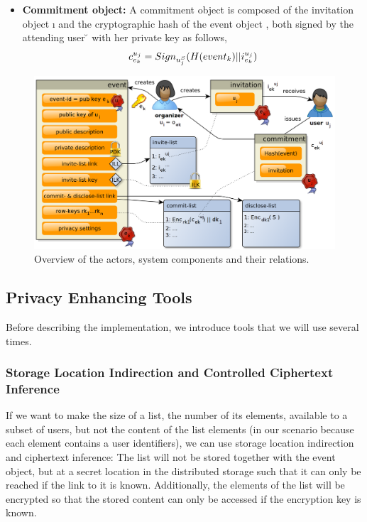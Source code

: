 \begin{itemize}
\item \textbf{Commitment object:} 
A commitment object is composed of the invitation object \i{} and the cryptographic 
hash of the event object \eo{}, both signed by the attending 
user \u{} with her private key \uS{} as follows,
\begin{equation*}
		\cm{} = Sign_{\uS{}}(H(\eo{})||\i{})
\end{equation*}
\end{itemize}

\begin{figure}
  \centering
  \includegraphics[width=.8\linewidth]{images/event-invitations-dosns/system-implementation}
  \caption{Overview of the actors, system components and their relations.}
  \label{figure:event-invitations-dosns:overview-objects-actions}
\end{figure}


\subsection{Privacy Enhancing Tools}
	\label{subsection:event-invitations-dosns:privacy-enhancing-tools}
Before describing the implementation, we introduce tools that we will use several times.

\subsubsection{Storage Location Indirection and Controlled Ciphertext Inference}
	\label{subsubsection:event-invitations-dosns:indirection-and-ciphertext-inferences}
If we want to make the size of a list, \ie the number of its elements, available 
to a subset of users, but not the content of 
the list elements (in our scenario because each element contains 
a user identifiers), we can use storage location indirection and ciphertext inference:
%
The list will not be stored together with the event object, but at a secret location in the distributed storage such that it can only 
be reached if the link to it is known. Additionally, the elements of the list will be encrypted so 
that the stored content can only be accessed if the encryption key is known. 

